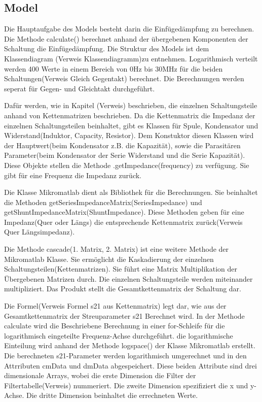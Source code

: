 \subsection{Model} \label{subsec:Model}
Die Hauptaufgabe des Models besteht darin die Einfügedämpfung zu berechnen. Die Methode calculate() berechnet anhand der übergebenen Komponenten der Schaltung die Einfügedämpfung. Die Struktur des Models ist dem Klassendiagram (Verweis Klassendiagramm)zu entnehmen. Logarithmisch verteilt werden 400 Werte in einem Bereich von 0Hz bis 30MHz für die beiden Schaltungen(Verweis Gleich Gegentakt) berechnet. Die Berechnungen werden seperat für Gegen- und Gleichtakt durchgeführt.

Dafür werden, wie in Kapitel (Verweis) beschrieben, die einzelnen Schaltungsteile anhand von Kettenmatrizen beschrieben. Da die Kettenmatrix die Impedanz der einzelnen Schaltungsteilen beinhaltet, gibt es Klassen für Spule, Kondensator und Widerstand(Induktor, Capacity, Resistor). Dem Konstuktor diesen Klassen wird der Hauptwert(beim Kondensator z.B. die Kapazität), sowie die Parasitären Parameter(beim Kondensator der Serie Widerstand und die Serie Kapazität). Diese Objekte stellen die Methode .getImpedance(frequency) zu verfügung. Sie gibt für eine Frequenz die Impedanz zurück.

Die Klasse Mikromatlab dient als Bibliothek für die Berechnungen. Sie beinhaltet die Methoden getSeriesImpedanceMatrix(SeriesImpedance) und getShuntImpedanceMatrix(ShuntImpedance). Diese Methoden geben für eine Impedanz(Quer oder Längs) die entsprechende Kettenmatrix zurück(Verweis Quer Längsimpedanz).

Die Methode cascade(1. Matrix, 2. Matrix) ist eine weitere Methode der Mikromatlab Klasse. Sie ermöglicht die Kaskadierung der einzelnen Schaltungsteilen(Kettenmatrizen). Sie führt eine Matrix Multiplikation der Übergebenen Matrizen durch. Die einzelnen Schaltungsteile werden miteinander multipliziert. Das Produkt stellt die Gesamtkettenmatrix der Schaltung dar. 

Die Formel(Verweis Formel s21 aus Kettenmatrix) legt dar, wie aus der Gesamtkettenmatrix der Streuparameter s21 Berechnet wird. In der Methode calculate wird die Beschriebene Berechnung in einer for-Schleife für die logarithmisch eingeteilte Frequenz-Achse durchgeführt. die logarithmische Einteilung wird anhand der Methode logspace() der Klasse Mikromatlab erstellt. Die berechneten s21-Parameter werden logarithmisch umgerechnet und in den Attrributen cmData und dmData abgespeichert. Diese beiden Attribute sind drei dimensionale Arrays, wobei die erste Dimension die Filter der Filtertabelle(Verweis) nummeriert. Die zweite Dimension spezifiziert die x und y-Achse. Die dritte Dimension beinhaltet die errechneten Werte. 

